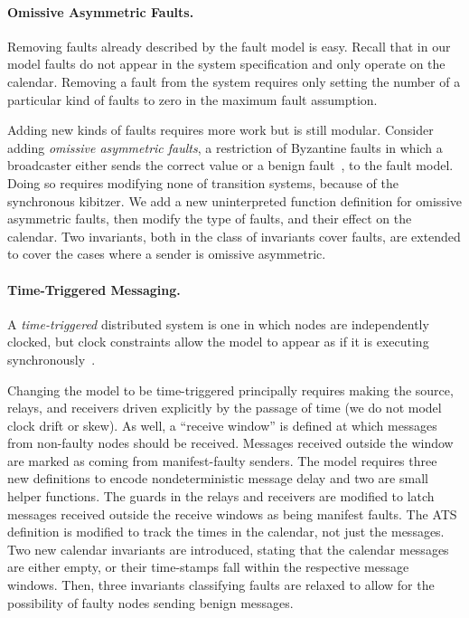 \documentclass{llncs/llncs}
\begin{document}
{\paragraph{Omissive Asymmetric Faults.}
Removing faults already described by the fault model is easy. Recall that in our model faults do not appear in the system specification and only operate on the calendar. Removing a fault from the system requires only setting the number of a particular kind of faults to zero in the maximum fault assumption.

Adding new kinds of faults requires more work but is still modular. Consider adding \emph{omissive asymmetric faults}, a restriction of Byzantine faults in which a broadcaster either sends the correct value or a benign fault~\cite{omissive}, to the fault model. Doing so requires modifying none of transition systems, because of the synchronous kibitzer. We add a new uninterpreted function definition for omissive asymmetric faults, then modify the type of faults, and their effect on the calendar. Two invariants, both in the class of invariants cover faults, are extended to cover the cases where a sender is omissive asymmetric.

\paragraph{Time-Triggered Messaging.}
A \emph{time-triggered} distributed system is one in which nodes are independently clocked, but clock constraints allow the model to appear as if it is executing synchronously~\cite{kopetz}.

Changing the model to be time-triggered principally requires making the source, relays, and receivers driven explicitly by the passage of time (we do not model clock drift or skew). As well, a ``receive window'' is defined at which messages from non-faulty nodes should be received. Messages received outside the window are marked as coming from manifest-faulty senders. The model requires three new definitions to  encode nondeterministic message delay and two are small helper functions. The guards in the relays and receivers are modified to latch messages received outside the receive windows as being manifest faults. The ATS definition is modified to track the times in the calendar, not just the messages. Two new calendar invariants are introduced, stating that the calendar messages are either empty, or their time-stamps fall within the respective message windows. Then, three invariants classifying faults are relaxed to allow for the possibility of faulty nodes sending benign messages.

}
\end{document}
